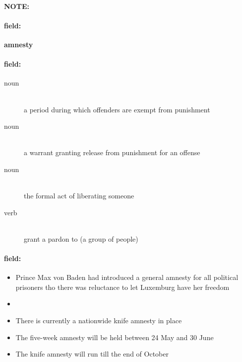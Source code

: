 \documentclass[12pt]{article}
\newenvironment{note}{\paragraph{NOTE:}}{}
\newenvironment{field}{\paragraph{field:}}{}
\begin{document}
\begin{note}
\begin{field}
\textbf{\large amnesty}
\end{field}


\begin{field}
\begin{description}
\item[noun] \hfill \\ 
a period during which offenders are exempt from punishment

\item[noun] \hfill \\ 
a warrant granting release from punishment for an offense

\item[noun] \hfill \\ 
the formal act of liberating someone

\item[verb] \hfill \\ 
grant a pardon to (a group of people)

\end{description}
\end{field}

\begin{field}
\begin{itemize}
\item Prince Max von Baden had introduced a general amnesty for all political prisoners tho there was reluctance to let Luxemburg have her freedom
\item 
\item There is currently a nationwide knife amnesty in place
\item The five-week amnesty will be held between 24 May and 30 June
\item The knife amnesty will run till the end of October
\end{itemize}
\end{field}
\end{note}
\end{document}
